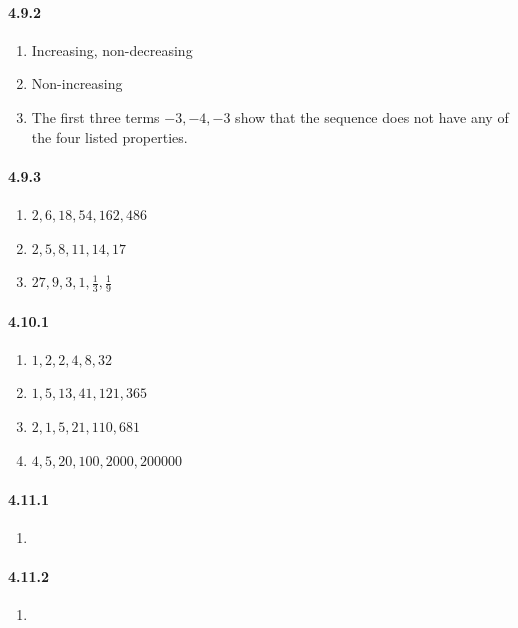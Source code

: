 \documentclass[11pt, letterpaper, twocolumn, fleqn]{article}
\begin{document}
    \paragraph{4.9.2}
        \begin{enumerate}
            \item Increasing, non-decreasing
            \item Non-increasing
            \item The first three terms $-3,-4,-3$ show that the sequence does not have any of the four listed properties.
        \end{enumerate}
    
    \paragraph{4.9.3}
        \begin{enumerate}
            \item $2,6,18,54,162,486$
            \item $2,5,8,11,14,17$
            \item $27,9,3,1,\frac{1}{3},\frac{1}{9}$
        \end{enumerate}
    
    \paragraph{4.10.1}
        \begin{enumerate}
            \item $1,2,2,4,8,32$
            \item $1,5,13,41,121,365$
            \item $2,1,5,21,110,681$
            \item $4,5,20,100,2000,200000$
        \end{enumerate}
    
    \paragraph{4.11.1}
        \begin{enumerate}
            \item 
        \end{enumerate}
    
    \paragraph{4.11.2}
        \begin{enumerate}
            \item 
        \end{enumerate}
    
\end{document}
